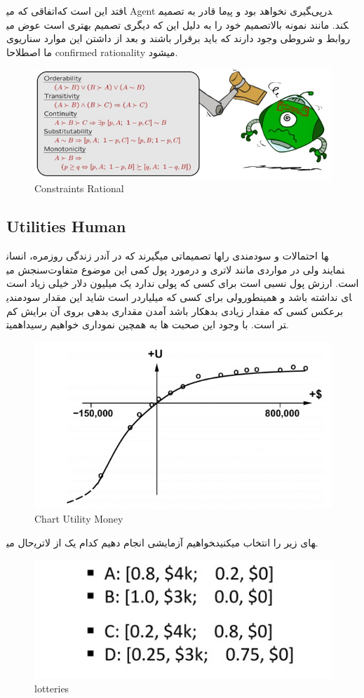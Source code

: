 اتفاقی که می‎افتد این است که Agent ما قادر به تصمیم‎گیری نخواهد بود و پی‎درپی تصمیم خود را به دلیل این که دیگری تصمیم بهتری است عوض می‎کند. مانند نمونه بالا روابط و شروطی وجود دارند که باید برقرار باشند و بعد از داشتن این موارد سناریوی ما اصطلاحا confirmed rationality میشود.


\begin{figure}[h!]
    \centering
    \includegraphics[width=0.8\linewidth]{images/rationality.jpg}
    \caption{Constraints Rational}
\end{figure}

\subsection{Utilities Human}
در زندگی روزمره، انسان‎ها تصمیماتی میگیرند که در آن‎ها احتمالات و سودمندی را سنجش می‎نمایند ولی در مواردی مانند لاتری و درمورد پول کمی این موضوع متفاوت است. ارزش پول نسبی است برای کسی که پولی ندارد یک میلیون دلار خیلی زیاد است ولی برای کسی که میلیاردر است شاید این مقدار سودمندی‎ای نداشته باشد و همینطور برعکس کسی که مقدار زیادی بدهکار باشد آمدن مقداری بدهی بروی آن برایش کم اهمیت‎تر است. با وجود این صحبت ها به همچین نموداری خواهیم رسید.


\begin{figure}[h!]
    \centering
    \includegraphics[width=0.6\linewidth]{images/moneyUtility.jpg}
    \caption{Chart Utility Money}
\end{figure}


حال می‎خواهیم آزمایشی انجام دهیم کدام یک از لاتری‎های زیر را انتخاب میکنید.

\begin{figure}[h!]
    \centering
    \includegraphics[width=0.6\linewidth]{images/lottery01.jpg}
    \caption{lotteries}
\end{figure}

